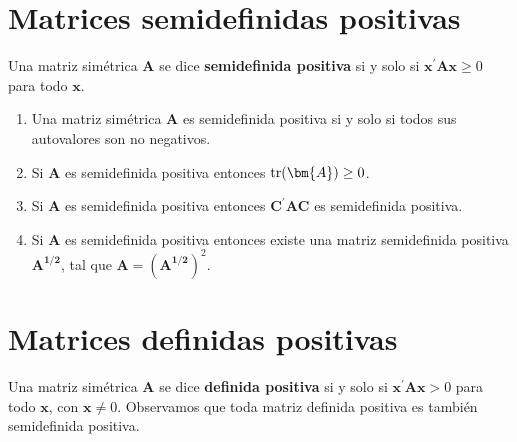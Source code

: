 \documentclass[
  a4paper,
  oneside]{scrbook}
\theoremstyle{definition}
\theoremstyle{definition}
\theoremstyle{definition}
\theoremstyle{definition}
\theoremstyle{remark}
\begin{document}
\section{Matrices semidefinidas positivas}\label{matrices-semidefinidas-positivas}

Una matriz simétrica \(\bm{A}\) se dice \textbf{semidefinida positiva} si y
solo si \(\bm{x}^\prime{}\bm{A}\bm{x}\geq 0\) para todo \(\bm{x}\).

\begin{enumerate}
\def\labelenumi{\arabic{enumi}.}
\item
  Una matriz simétrica \(\bm{A}\) es semidefinida positiva si y solo si
  todos sus autovalores son no negativos.
\item
  Si \(\bm{A}\) es semidefinida positiva entonces
  \(\textnormal{tr}(\bm{A})\geq 0\).
\item
  Si \(\bm{A}\) es semidefinida positiva entonces
  \(\bm{C}^\prime{}\bm{A}\bm{C}\) es semidefinida positiva.
\item
  Si \(\bm{A}\) es semidefinida positiva entonces existe una matriz
  semidefinida positiva \(\bm{A^{1/2}}\), tal que
  \(\bm{A}=(\bm{A^{1/2}})^2\).
\end{enumerate}

\section{Matrices definidas positivas}\label{matrices-definidas-positivas}

Una matriz simétrica \(\bm{A}\) se dice \textbf{definida positiva} si y solo si
\(\bm{x}^\prime{}\bm{A}\bm{x}> 0\) para todo \(\bm{x}\), con \(\bm{x}\neq 0\).
Observamos que toda matriz definida positiva es también semidefinida
positiva.
\end{document}
